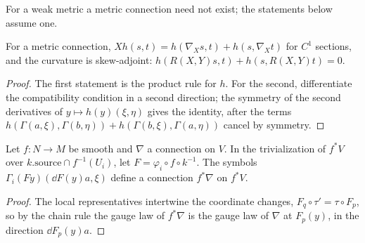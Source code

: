 For a weak metric a metric connection need not exist; the statements below assume one.

\begin{theorem}
  \label{thm:metric-connections}
  \leanok
  For a metric connection, $X h(s, t) = h(\nabla_X s, t) + h(s, \nabla_X t)$ for $C^1$
  sections, and the curvature is skew-adjoint:
  $h(R(X, Y)s, t) + h(s, R(X, Y)t) = 0$.
\end{theorem}

\begin{proof}
  \leanok
  The first statement is the product rule for $h$. For the second, differentiate the
  compatibility condition in a second direction; the symmetry of the second derivatives of
  $y \mapsto h(y)(\xi, \eta)$ gives the identity, after the terms
  $h(\Gamma(a, \xi), \Gamma(b, \eta)) + h(\Gamma(b, \xi), \Gamma(a, \eta))$ cancel by symmetry.
\end{proof}

\begin{theorem}
  \label{thm:pullback-connection}
  \leanok
  Let $f \colon N \to M$ be smooth and $\nabla$ a connection on $V$. In the trivialization of
  $f^*V$ over $k.\mathrm{source} \cap f^{-1}(U_i)$, let $F = \varphi_i \circ f \circ k^{-1}$. The
  symbols $\Gamma_i(F y)(\dd F(y) a, \xi)$ define a connection $f^*\nabla$ on $f^*V$.
\end{theorem}

\begin{proof}
  \leanok
  The local representatives intertwine the coordinate changes, $F_q \circ \tau' = \tau \circ F_p$,
  so by the chain rule the gauge law of $f^*\nabla$ is the gauge law of $\nabla$ at $F_p(y)$, in
  the direction $\dd F_p(y) a$.
\end{proof}

